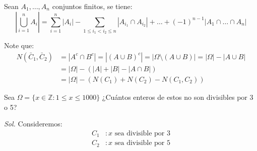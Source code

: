 \begin{prop}
	\label{prop: Principio de inclusión exclusión}
	Sean $A_1, \dots, A_n$ conjuntos finitos, se tiene:
	\begin{equation*}
		\left| \bigcup_{i=1}^n A_i \right| = \sum_{i=1}^n |A_i| - \sum_{1 \le i_1 < i_2 \le n} |A_{i_1} \cap A_{i_2}| + \dots + (-1)^{n-1} |A_1 \cap \dots \cap A_n|
	\end{equation*}

\end{prop}


\begin{enefecto}
	Note que:
	\begin{align*}
		N(\bar{C}_1, \bar{C}_2) & = |A^c \cap B^c| = |(A \cup B)^c| = |\Omega \setminus (A \cup B)| = |\Omega| - |A \cup B| \\
		                        & = |\Omega| - (|A| + |B| - |A \cap B|)                                                     \\
		                        & = |\Omega| - (N(C_1) + N(C_2) - N(C_1, C_2))
	\end{align*}
\end{enefecto}

\begin{eje}
	Sea $\Omega = \{x \in \mathbb{Z} : 1 \le x \le 1000\}$ ¿Cuántos enteros de estos no son divisibles por 3 o 5?
\end{eje}

\textit{ Sol. } Consideremos:
\begin{align*}
	C_1 & : x \text{ sea divisible por } 3 \\
	C_2 & : x \text{ sea divisible por } 5
\end{align*}

